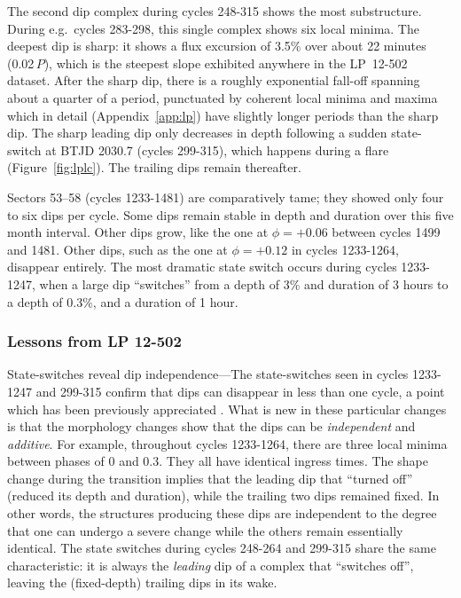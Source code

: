 \documentclass[11pt,twocolumn,tighten]{aastex63}
\begin{document}
The second dip complex during cycles 248-315 shows the most
substructure.  During e.g.~cycles 283-298, this single complex shows
six local minima.  The deepest dip is sharp: it shows a flux excursion
of 3.5\% over about 22 minutes (0.02\,$P$), which is the steepest
slope exhibited anywhere in the LP~12-502 dataset.  After the sharp
dip, there is a roughly exponential fall-off spanning about a quarter
of a period, punctuated by coherent local minima and maxima which in
detail (Appendix~\ref{app:lp}) have slightly longer periods than the
sharp dip.  The sharp leading dip only decreases in depth following a
sudden state-switch at BTJD 2030.7 (cycles 299-315), which happens
during a flare (Figure~\ref{fig:lplc}).  The trailing dips remain
thereafter.

Sectors 53--58 (cycles 1233-1481) are comparatively tame; they showed
only four to six dips per cycle.  Some dips remain stable in depth and
duration over this five month interval.  Other dips grow, like the one
at $\phi = +0.06$ between cycles 1499 and 1481.  Other dips, such as
the one at $\phi = +0.12$ in cycles 1233-1264, disappear entirely.
The most dramatic state switch occurs during cycles 1233-1247, when a
large dip ``switches'' from a depth of 3\% and duration of 3 hours to
a depth of 0.3\%, and a duration of 1 hour.


\subsubsection{Lessons from LP 12-502}
\label{subsec:lplessons}

{\sc State-switches reveal dip independence}---The state-switches seen
in cycles 1233-1247 and 299-315 confirm that dips can disappear in
less than one cycle, a point which has been previously appreciated
\citep{2017AJ....153..152S}.  What is new in these particular changes
is that the morphology changes show that the dips can be {\it
independent} and {\it additive}.  For example, throughout cycles
1233-1264, there are three local minima between phases of 0 and 0.3.
They all have identical ingress times.  The shape change during the
transition implies that the leading dip that ``turned off'' (reduced
its depth and duration), while the trailing two dips remained fixed.
In other words, the structures producing these dips are independent to
the degree that one can undergo a severe change while the others
remain essentially identical.  The state switches during cycles
248-264 and 299-315 share the same characteristic: it is always the
{\it leading} dip of a complex that ``switches off'', leaving the
(fixed-depth) trailing dips in its wake.
\end{document}
